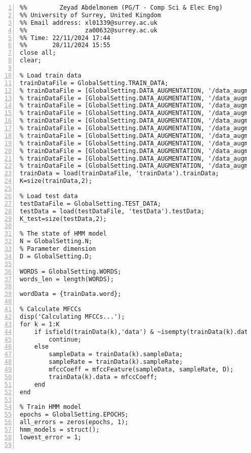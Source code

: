\documentclass{article}
\begin{document}
\begin{lstlisting}[frame=single, numbers=left, style=Matlab-editor, caption={train\_model.m}, label={lst:train_model}]
  %% Author: Xiaoguang Liang (PG/T - Comp Sci & Elec Eng)
%%         Zeyad Abdelmonem (PG/T - Comp Sci & Elec Eng)
%% University of Surrey, United Kingdom
%% Email address: xl01339@surrey.ac.uk
%%                za00632@surrey.ac.uk
%% Time: 22/11/2024 17:44
%%       28/11/2024 15:55
close all;
clear;

% Load train data
trainDataFile = GlobalSetting.TRAIN_DATA;
% trainDataFile = [GlobalSetting.DATA_AUGMENTATION, '/data_augmentation_male_x1.mat'];
% trainDataFile = [GlobalSetting.DATA_AUGMENTATION, '/data_augmentation_male_x2.mat'];
% trainDataFile = [GlobalSetting.DATA_AUGMENTATION, '/data_augmentation_male_x3.mat'];
% trainDataFile = [GlobalSetting.DATA_AUGMENTATION, '/data_augmentation_male_x5.mat'];
% trainDataFile = [GlobalSetting.DATA_AUGMENTATION, '/data_augmentation_male_x10.mat'];
% trainDataFile = [GlobalSetting.DATA_AUGMENTATION, '/data_augmentation_male_x50.mat'];
% trainDataFile = [GlobalSetting.DATA_AUGMENTATION, '/data_augmentation_word_x2.mat'];
% trainDataFile = [GlobalSetting.DATA_AUGMENTATION, '/data_augmentation_word_x5.mat'];
% trainDataFile = [GlobalSetting.DATA_AUGMENTATION, '/data_augmentation_male_word_x5.mat'];
% trainDataFile = [GlobalSetting.DATA_AUGMENTATION, '/data_augmentation_male__x5_female.mat'];
% trainDataFile = [GlobalSetting.DATA_AUGMENTATION, '/data_augmentation_male__x5_word_x3.mat'];
trainData = load(trainDataFile, 'trainData').trainData;
K=size(trainData,2);

% Load test data
testDataFile = GlobalSetting.TEST_DATA;
testData = load(testDataFile, 'testData').testData;
K_test=size(testData,2);

% The state of HMM model
N = GlobalSetting.N;
% Parameter dimension
D = GlobalSetting.D;

WORDS = GlobalSetting.WORDS;
words_len = length(WORDS);

wordData = {trainData.word};

% Calculate MFCCs
disp('Calculating MFCCs...');
for k = 1:K
    if isfield(trainData(k),'data') & ~isempty(trainData(k).data)
        continue;
    else
        sampleData = trainData(k).sampleData;
        sampleRate = trainData(k).sampleRate;
        mfccCoeff = mfccFeature(sampleData, sampleRate, D);
        trainData(k).data = mfccCoeff;
    end
end

% Train HMM model
epochs = GlobalSetting.EPOCHS;
all_errors = zeros(epochs, 1);
hmm_models = struct();
lowest_error = 1;


\end{lstlisting}
\end{document}
